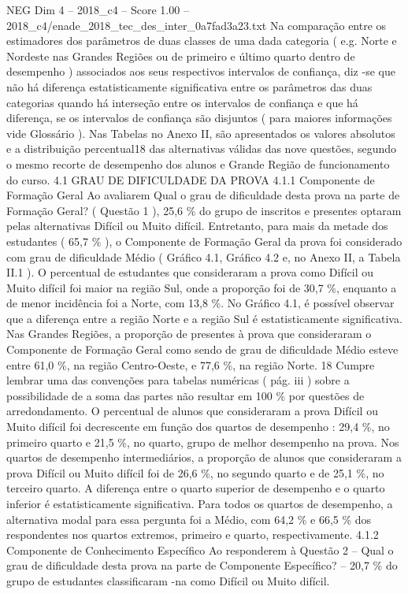 \begin{textsample}{NEG Dim 4 – 2018\_c4 – Score 1.00 – 2018\_c4/enade\_2018\_tec\_des\_inter\_0a7fad3a23.txt}
Na comparação entre os estimadores dos parâmetros de duas classes de uma dada categoria ( e.g.
Norte e Nordeste nas Grandes Regiões ou de primeiro e último quarto dentro de desempenho ) associados aos seus respectivos intervalos de confiança, diz -se que não há diferença estatisticamente significativa entre os parâmetros das duas categorias quando há interseção entre os intervalos de confiança e que há diferença, se os intervalos de confiança são disjuntos ( para maiores informações vide Glossário ).
Nas Tabelas no Anexo II, são apresentados os valores absolutos e a distribuição percentual18 das alternativas válidas das nove questões, segundo o mesmo recorte de desempenho dos alunos e Grande Região de funcionamento do curso. 4.1 GRAU DE DIFICULDADE DA PROVA 4.1.1 Componente de Formação Geral Ao avaliarem Qual o grau de dificuldade desta prova na parte de Formação Geral? ( Questão 1 ), 25,6 \% do grupo de inscritos e presentes optaram pelas alternativas Difícil ou Muito difícil.
Entretanto, para mais da metade dos estudantes ( 65,7 \% ), o Componente de Formação Geral da prova foi considerado com grau de dificuldade Médio ( Gráfico 4.1, Gráfico 4.2 e, no Anexo II, a Tabela II.1 ).
O percentual de estudantes que consideraram a prova como Difícil ou Muito difícil foi maior na região Sul, onde a proporção foi de 30,7 \%, enquanto a de menor incidência foi a Norte, com 13,8 \%.
No Gráfico 4.1, é possível observar que a diferença entre a região Norte e a região Sul é estatisticamente significativa.
Nas Grandes Regiões, a proporção de presentes à prova que consideraram o Componente de Formação Geral como sendo de grau de dificuldade Médio esteve entre 61,0 \%, na região Centro-Oeste, e 77,6 \%, na região Norte. 18 Cumpre lembrar uma das convenções para tabelas numéricas ( pág. iii ) sobre a possibilidade de a soma das partes não resultar em 100 \% por questões de arredondamento.
O percentual de alunos que consideraram a prova Difícil ou Muito difícil foi decrescente em função dos quartos de desempenho : 29,4 \%, no primeiro quarto e 21,5 \%, no quarto, grupo de melhor desempenho na prova.
Nos quartos de desempenho intermediários, a proporção de alunos que consideraram a prova Difícil ou Muito difícil foi de 26,6 \%, no segundo quarto e de 25,1 \%, no terceiro quarto.
A diferença entre o quarto superior de desempenho e o quarto inferior é estatisticamente significativa.
Para todos os quartos de desempenho, a alternativa modal para essa pergunta foi a Médio, com 64,2 \% e 66,5 \% dos respondentes nos quartos extremos, primeiro e quarto, respectivamente. 4.1.2 Componente de Conhecimento Específico Ao responderem à Questão 2 – Qual o grau de dificuldade desta prova na parte de Componente Específico? – 20,7 \% do grupo de estudantes classificaram -na como Difícil ou Muito difícil.

\end{textsample}
